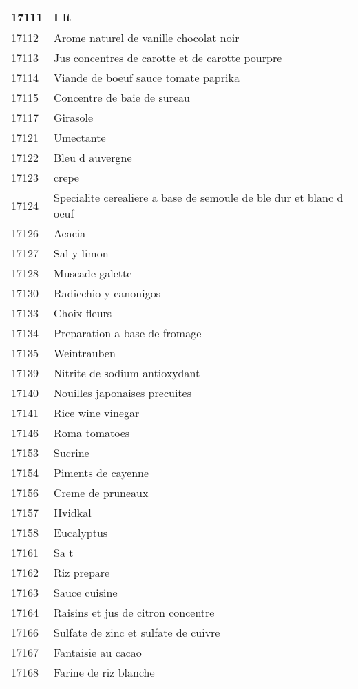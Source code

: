 \begin{longtable}{|l|l|}
17111 & I lt \\ \hline 
17112 & Arome naturel de vanille chocolat noir \\ \hline 
17113 & Jus concentres de carotte et de carotte pourpre \\ \hline 
17114 & Viande de boeuf sauce tomate paprika \\ \hline 
17115 & Concentre de baie de sureau \\ \hline 
17117 & Girasole \\ \hline 
17121 & Umectante \\ \hline 
17122 & Bleu d auvergne \\ \hline 
17123 & crepe \\ \hline 
17124 & Specialite cerealiere a base de semoule de ble dur et blanc d oeuf \\ \hline 
17126 & Acacia \\ \hline 
17127 & Sal y limon \\ \hline 
17128 & Muscade galette \\ \hline 
17130 & Radicchio y canonigos \\ \hline 
17133 & Choix fleurs \\ \hline 
17134 & Preparation a base de fromage \\ \hline 
17135 & Weintrauben \\ \hline 
17139 & Nitrite de sodium antioxydant \\ \hline 
17140 & Nouilles japonaises precuites \\ \hline 
17141 & Rice wine vinegar \\ \hline 
17146 & Roma tomatoes \\ \hline 
17153 & Sucrine \\ \hline 
17154 & Piments de cayenne \\ \hline 
17156 & Creme de pruneaux \\ \hline 
17157 & Hvidkal \\ \hline 
17158 & Eucalyptus \\ \hline 
17161 & Sa t \\ \hline 
17162 & Riz prepare \\ \hline 
17163 & Sauce cuisine \\ \hline 
17164 & Raisins et jus de citron concentre \\ \hline 
17166 & Sulfate de zinc et sulfate de cuivre \\ \hline 
17167 & Fantaisie au cacao \\ \hline 
17168 & Farine de riz blanche \\ \hline 

\end{longtable}
